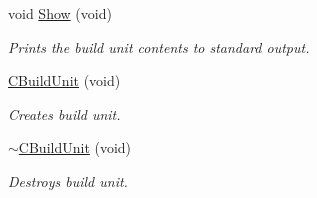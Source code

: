 \begin{DoxyCompactItemize}
void \hyperlink{classCBuildUnit_a6c0349730fe7130c043e504d81f6c898}{Show} (void)
\begin{DoxyCompactList}\small\item\em Prints the build unit contents to standard output. \end{DoxyCompactList}\item 
\hyperlink{classCBuildUnit_ae0c7be712022bd1b21e667d50b4951d9}{C\-Build\-Unit} (void)
\begin{DoxyCompactList}\small\item\em Creates build unit. \end{DoxyCompactList}\item 
\hyperlink{classCBuildUnit_a5a75daf4424828e6390954d06193d5b8}{$\sim$\-C\-Build\-Unit} (void)
\begin{DoxyCompactList}\small\item\em Destroys build unit. \end{DoxyCompactList}\end{DoxyCompactItemize}
